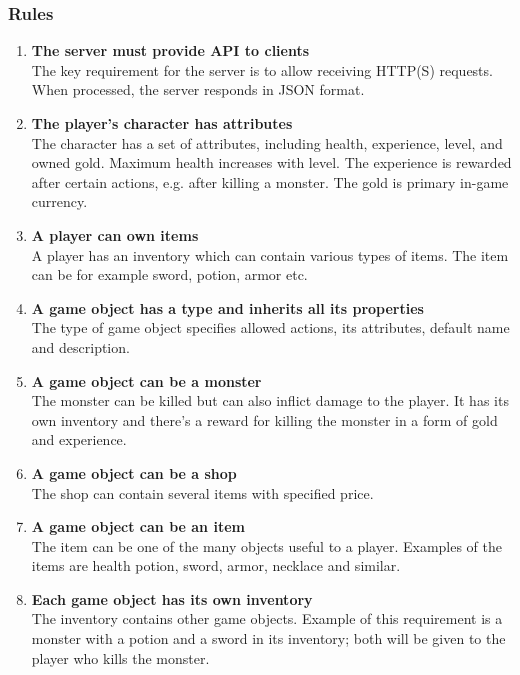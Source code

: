 		\subsubsection*{Rules}
		\begin{enumerate}
			\item \textbf{The server must provide API to clients} \\
			The key requirement for the server is to allow receiving HTTP(S) requests. When processed, the server responds in JSON format.
						
			\item \textbf{The player's character has attributes} \\
			The character has a set of attributes, including health, experience, level, and owned gold. Maximum health increases with level. The experience is rewarded after certain actions, e.g. after killing a monster. The gold is primary in-game currency.
			  
			\item \textbf{A player can own items} \\
			A player has an inventory which can contain various types of items. The item can be for example sword, potion, armor etc.
			
			\item \textbf{A game object has a type and inherits all its properties} \\
			The type of game object specifies allowed actions, its attributes, default name and description.			
			
			\item \textbf{A game object can be a monster} \\
			The monster can be killed but can also inflict damage to the player. It has its own inventory and there's a reward for killing the monster in a form of gold and experience.
			
			\item \textbf{A game object can be a shop} \\
			The shop can contain several items with specified price.  
			
			\item \textbf{A game object can be an item} \\	
			The item can be one of the many objects useful to a player. Examples of the items are health potion, sword, armor, necklace and similar.
			
			\item \textbf{Each game object has its own inventory} \\
			The inventory contains other game objects. Example of this requirement is a monster with a potion and a sword in its inventory; both will be given to the player who kills the monster.  
			

\end{enumerate}
